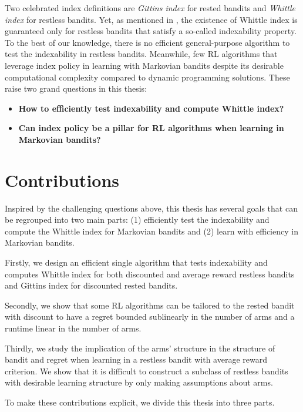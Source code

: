 Two celebrated index definitions are \emph{Gittins index} \cite{gittins1979bandit} for rested bandits and \emph{Whittle index} \cite{whittle1988restless} for restless bandits.
Yet, as mentioned in \cite[Chapter~14]{whittle1996optimal}, the existence of Whittle index is guaranteed only for restless bandits that satisfy a so-called indexability property.
To the best of our knowledge, there is no efficient general-purpose algorithm to test the indexability in restless bandits.
Meanwhile, few RL algorithms that leverage index policy in learning with Markovian bandits despite its desirable computational complexity compared to dynamic programming solutions.
These raise two grand questions in this thesis:
\begin{itemize}
    \item {\color{myblue}\bfseries\large How to efficiently test indexability and compute Whittle index?}
    \item {\color{myblue}\bfseries\large Can index policy be a pillar for RL algorithms when learning in Markovian bandits?}
\end{itemize}

\section{Contributions}

Inspired by the challenging questions above, this thesis has several goals that can be regrouped into two main parts: (1) efficiently test the indexability and compute the Whittle index for Markovian bandits and (2) learn with efficiency in Markovian bandits.

Firstly, we design an efficient single algorithm that tests indexability and computes Whittle index for both discounted and average reward restless bandits and Gittins index for discounted rested bandits.

Secondly, we show that some RL algorithms can be tailored to the rested bandit with discount to have a regret bounded sublinearly in the number of arms and a runtime linear in the number of arms.

Thirdly, we study the implication of the arms' structure in the structure of bandit and regret when learning in a restless bandit with average reward criterion.
We show that it is difficult to construct a subclass of restless bandits with desirable learning structure by only making assumptions about arms.

To make these contributions explicit, we divide this thesis into three parts.

